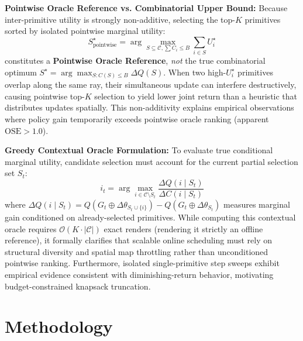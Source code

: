 \documentclass[10pt,twocolumn,letterpaper]{article}
\begin{document}
\textbf{Pointwise Oracle Reference vs. Combinatorial Upper Bound:}
Because inter-primitive utility is strongly non-additive, selecting the top-$K$ primitives sorted by isolated pointwise marginal utility:
\begin{equation}
S^\star_{\mathrm{pointwise}} = \arg\max_{S \subseteq \mathcal{C}, \sum C_i \le B} \sum_{i \in S} U_i^\star
\end{equation}
constitutes a \textbf{Pointwise Oracle Reference}, \textit{not} the true combinatorial optimum $S^\star = \arg\max_{S: C(S) \le B} \Delta Q(S)$. When two high-$U_i^\star$ primitives overlap along the same ray, their simultaneous update can interfere destructively, causing pointwise top-$K$ selection to yield lower joint return than a heuristic that distributes updates spatially. This non-additivity explains empirical observations where policy gain temporarily exceeds pointwise oracle ranking (apparent $\mathrm{OSE} > 1.0$).

\textbf{Greedy Contextual Oracle Formulation:}
To evaluate true conditional marginal utility, candidate selection must account for the current partial selection set $S_t$:
\begin{equation}
i_t = \arg\max_{i \in \mathcal{C} \setminus S_t} \frac{\Delta Q(i \mid S_t)}{\Delta C(i \mid S_t)}
\end{equation}
where $\Delta Q(i \mid S_t) = Q(G_t \oplus \Delta \theta_{S_t \cup \{i\}}) - Q(G_t \oplus \Delta \theta_{S_t})$ measures marginal gain conditioned on already-selected primitives. While computing this contextual oracle requires $\mathcal{O}(K \cdot |\mathcal{C}|)$ exact renders (rendering it strictly an offline reference), it formally clarifies that scalable online scheduling must rely on structural diversity and spatial map throttling rather than unconditioned pointwise ranking. Furthermore, isolated single-primitive step sweeps exhibit empirical evidence consistent with diminishing-return behavior, motivating budget-constrained knapsack truncation.

\section{Methodology}
\end{document}
